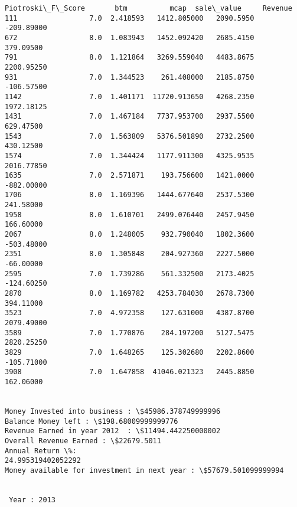 \documentclass[11pt]{article}
\begin{document}
\begin{Verbatim}[commandchars=\\\{\}]
      Piotroski\_F\_Score       btm          mcap  sale\_value     Revenue
111                 7.0  2.418593   1412.805000   2090.5950  -209.89000
672                 8.0  1.083943   1452.092420   2685.4150   379.09500
791                 8.0  1.121864   3269.559040   4483.8675  2200.95250
931                 7.0  1.344523    261.408000   2185.8750  -106.57500
1142                7.0  1.401171  11720.913650   4268.2350  1972.18125
1431                7.0  1.467184   7737.953700   2937.5500   629.47500
1543                7.0  1.563809   5376.501890   2732.2500   430.12500
1574                7.0  1.344424   1177.911300   4325.9535  2016.77850
1635                7.0  2.571871    193.756600   1421.0000  -882.00000
1706                8.0  1.169396   1444.677640   2537.5300   241.58000
1958                8.0  1.610701   2499.076440   2457.9450   166.60000
2067                8.0  1.248005    932.790040   1802.3600  -503.48000
2351                8.0  1.305848    204.927360   2227.5000   -66.00000
2595                7.0  1.739286    561.332500   2173.4025  -124.60250
2870                8.0  1.169782   4253.784030   2678.7300   394.11000
3523                7.0  4.972358    127.631000   4387.8700  2079.49000
3589                7.0  1.770876    284.197200   5127.5475  2820.25250
3829                7.0  1.648265    125.302680   2202.8600  -105.71000
3908                7.0  1.647858  41046.021323   2445.8850   162.06000


Money Invested into business : \$45986.378749999996
Balance Money left : \$198.68009999999776
Revenue Earned in year 2012  : \$11494.442250000002
Overall Revenue Earned : \$22679.5011
Annual Return \%:
24.995319402052292
Money available for investment in next year : \$57679.501099999994


 Year : 2013


\end{Verbatim}
\end{document}
